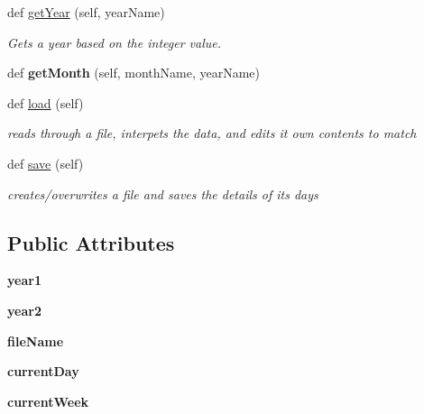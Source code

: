\begin{DoxyCompactItemize}
def \hyperlink{classapp_1_1Calendar_1_1Calendar_abf784f86c98b145f815b3042b3d7af7a}{get\+Year} (self, year\+Name)
\begin{DoxyCompactList}\small\item\em Gets a year based on the integer value. \end{DoxyCompactList}\item 
def {\bfseries get\+Month} (self, month\+Name, year\+Name)\hypertarget{classapp_1_1Calendar_1_1Calendar_aec6c78b6d635b2112b9153055080a3ab}{}\label{classapp_1_1Calendar_1_1Calendar_aec6c78b6d635b2112b9153055080a3ab}

\item 
def \hyperlink{classapp_1_1Calendar_1_1Calendar_a7269addb3cb46f6b2dcbf803f6a944c3}{load} (self)
\begin{DoxyCompactList}\small\item\em reads through a file, interpets the data, and edits it own contents to match \end{DoxyCompactList}\item 
def \hyperlink{classapp_1_1Calendar_1_1Calendar_abbca0136c829cf9635d2cf5d464bb6da}{save} (self)
\begin{DoxyCompactList}\small\item\em creates/overwrites a file and saves the details of its days \end{DoxyCompactList}\end{DoxyCompactItemize}
\subsection*{Public Attributes}
\begin{DoxyCompactItemize}
\item 
{\bfseries year1}\hypertarget{classapp_1_1Calendar_1_1Calendar_a69b07684562125498bed12d6d79eb248}{}\label{classapp_1_1Calendar_1_1Calendar_a69b07684562125498bed12d6d79eb248}

\item 
{\bfseries year2}\hypertarget{classapp_1_1Calendar_1_1Calendar_acf478f7f16da4058a14ddb8bba85203d}{}\label{classapp_1_1Calendar_1_1Calendar_acf478f7f16da4058a14ddb8bba85203d}

\item 
{\bfseries file\+Name}\hypertarget{classapp_1_1Calendar_1_1Calendar_aac31ffbe15c5a0efe0f16b4f0977b5ed}{}\label{classapp_1_1Calendar_1_1Calendar_aac31ffbe15c5a0efe0f16b4f0977b5ed}

\item 
{\bfseries current\+Day}\hypertarget{classapp_1_1Calendar_1_1Calendar_a868521f7e6750e69a758b712c73fd573}{}\label{classapp_1_1Calendar_1_1Calendar_a868521f7e6750e69a758b712c73fd573}

\item 
{\bfseries current\+Week}\hypertarget{classapp_1_1Calendar_1_1Calendar_a13be231c54e4e231876a55083e26a2e2}{}\label{classapp_1_1Calendar_1_1Calendar_a13be231c54e4e231876a55083e26a2e2}

\end{DoxyCompactItemize}


